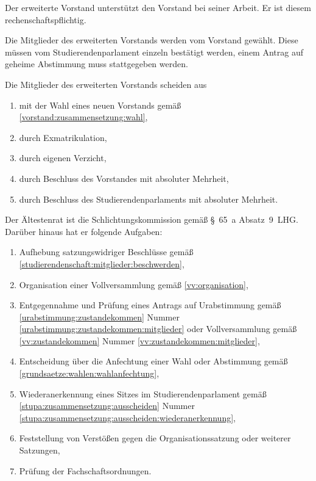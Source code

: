 \begin{jurdoc}
%
%


\label{erweitertervorstand:aufgaben}
Der erweiterte Vorstand unterstützt den Vorstand bei seiner Arbeit. Er ist diesem rechenschaftspflichtig.

 \label{erweitertervorstand:wahl}

Die Mitglieder des erweiterten Vorstands werden vom Vorstand gewählt. Diese müssen vom Studierendenparlament einzeln bestätigt werden, einem Antrag auf geheime Abstimmung muss stattgegeben werden.

Die Mitglieder des erweiterten Vorstands scheiden aus
\begin{enumerate}
  \item mit der Wahl eines neuen Vorstands gemäß \ref{vorstand:zusammensetzung:wahl},
  \item durch Exmatrikulation,
  \item durch eigenen Verzicht,
  \item durch Beschluss des Vorstandes mit absoluter Mehrheit,
  \item durch Beschluss des Studierendenparlaments mit absoluter Mehrheit.
\end{enumerate}


%
%


\label{aera:aufgaben}

Der Ältestenrat ist die Schlichtungskommission gemäß §~65~a Absatz~9~LHG. Darüber hinaus hat er folgende Aufgaben: \label{aera:aufgaben:allgemein}
  \begin{enumerate}
  \item Aufhebung satzungswidriger Beschlüsse gemäß \ref{studierendenschaft:mitglieder:beschwerden},
  \item \label{aera:aufgaben:vv} Organisation einer Vollversammlung gemäß \ref{vv:organisation},
  \item \label{aera:aufgaben:ua} Entgegennahme und Prüfung eines Antrags auf Urabstimmung  gemäß \ref{urabstimmung:zustandekommen} Nummer \ref{urabstimmung:zustandekommen:mitglieder} oder Vollversammlung gemäß \ref{vv:zustandekommen} Nummer \ref{vv:zustandekommen:mitglieder},
  \item Entscheidung über die Anfechtung einer Wahl oder Abstimmung gemäß \ref{grundsaetze:wahlen:wahlanfechtung},
  \item Wiederanerkennung eines Sitzes im Studierendenparlament  gemäß \ref{stupa:zusammensetzung:ausscheiden} Nummer \ref{stupa:zusammensetzung:ausscheiden:wiederanerkennung},
  \item Feststellung von Verstößen gegen die Organisationssatzung oder weiterer Satzungen,
  \item Prüfung der Fachschaftsordnungen.
  \end{enumerate}


\end{jurdoc}
